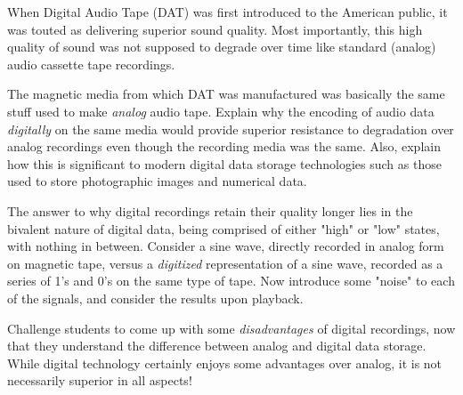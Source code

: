 

When Digital Audio Tape (DAT) was first introduced to the American public, it was touted as delivering superior sound quality.  Most importantly, this high quality of sound was not supposed to degrade over time like standard (analog) audio cassette tape recordings.

The magnetic media from which DAT was manufactured was basically the same stuff used to make {\it analog} audio tape.  Explain why the encoding of audio data {\it digitally} on the same media would provide superior resistance to degradation over analog recordings even though the recording media was the same.  Also, explain how this is significant to modern digital data storage technologies such as those used to store photographic images and numerical data.







The answer to why digital recordings retain their quality longer lies in the bivalent nature of digital data, being comprised of either "high" or "low" states, with nothing in between.  Consider a sine wave, directly recorded in analog form on magnetic tape, versus a {\it digitized} representation of a sine wave, recorded as a series of 1's and 0's on the same type of tape.  Now introduce some "noise" to each of the signals, and consider the results upon playback.







Challenge students to come up with some {\it disadvantages} of digital recordings, now that they understand the difference between analog and digital data storage.  While digital technology certainly enjoys some advantages over analog, it is not necessarily superior in all aspects!




